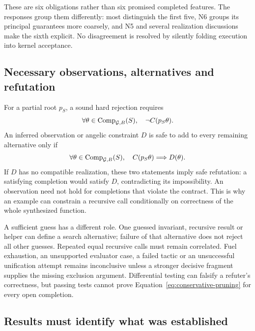 These are six obligations rather than six promised completed features.
The responses group them differently: most distinguish the first five,
N6 groups its principal guarantees more coarsely, and N5 and several
realization discussions make the sixth explicit. No disagreement is resolved by silently
folding execution into kernel acceptance.

\subsection{Necessary observations, alternatives and refutation}

For a partial root $p_S$, a sound hard rejection requires
\begin{equation}\label{eq:conservative-pruning}
 \forall\theta\in\mathrm{Comp}_{\mathcal G,B}(S),\quad \neg C(p_S\theta).
\end{equation}
An inferred observation or angelic constraint $D$ is safe to add to every
remaining alternative only if
\begin{equation}\label{eq:necessary-observation}
 \forall\theta\in\mathrm{Comp}_{\mathcal G,B}(S),\quad
 C(p_S\theta)\Longrightarrow D(\theta).
\end{equation}
If $D$ has no compatible realization, these two statements imply safe
refutation: a satisfying completion would satisfy $D$, contradicting its
impossibility. An observation need not hold for completions that violate the
contract. This is why an example can constrain a recursive call conditionally
on correctness of the whole synthesized function.

A sufficient guess has a different role. One guessed invariant, recursive
result or helper can define a search alternative; failure of that alternative
does not reject all other guesses. Repeated equal recursive calls must remain
correlated. Fuel exhaustion, an unsupported evaluator case, a failed tactic
or an unsuccessful unification attempt remains inconclusive unless a stronger
decisive fragment supplies the missing exclusion argument. Differential
testing can falsify a refuter's correctness, but passing tests cannot prove
Equation~\ref{eq:conservative-pruning} for every open completion.

\subsection{Results must identify what was established}

